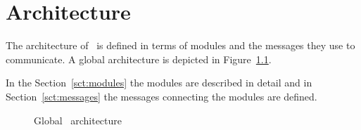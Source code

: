 \chapter{\label{cpt:architecture}Architecture}

The architecture of \Amber\ is defined in terms of modules and the messages
they use to communicate. A global architecture is depicted in
Figure~\ref{fig:global-architecture}.

In the Section~\ref{sct:modules} the modules are described in detail and in
Section~\ref{sct:messages} the messages connecting the modules are defined.

\begin{figure}
    \centering
    \caption{\label{fig:global-architecture}Global \Amber\ architecture}
\end{figure}






